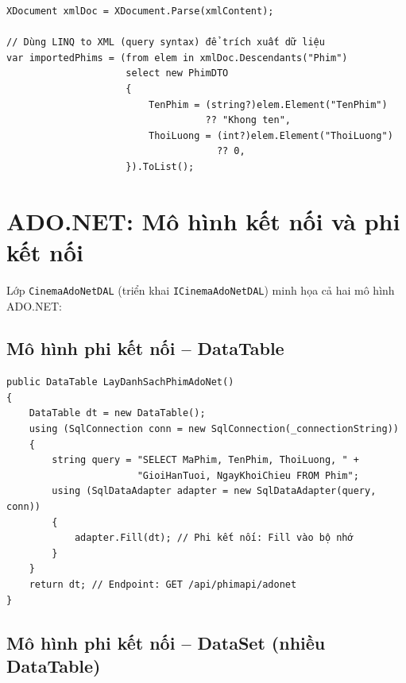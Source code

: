 \documentclass[12pt,a4paper,oneside]{book}
\theoremstyle{plain}
\numberwithin{equation}{chapter}
\begin{document}
\begin{lstlisting}[style=csharpstyle, caption={LINQ to XML -- Import phim từ XML}]
XDocument xmlDoc = XDocument.Parse(xmlContent);

// Dùng LINQ to XML (query syntax) để trích xuất dữ liệu
var importedPhims = (from elem in xmlDoc.Descendants("Phim")
                     select new PhimDTO
                     {
                         TenPhim = (string?)elem.Element("TenPhim")
                                   ?? "Khong ten",
                         ThoiLuong = (int?)elem.Element("ThoiLuong") 
                                     ?? 0,
                     }).ToList();
\end{lstlisting}

\section{ADO.NET: Mô hình kết nối và phi kết nối}\label{Sec4.3}

\noindent Lớp \texttt{CinemaAdoNetDAL} (triển khai \texttt{ICinemaAdoNetDAL}) minh họa cả hai mô hình ADO.NET:

\subsection{Mô hình phi kết nối -- DataTable}\label{sub4.3.1}

\begin{lstlisting}[style=csharpstyle, caption={ADO.NET -- SqlDataAdapter + DataTable (phi kết nối)}]
public DataTable LayDanhSachPhimAdoNet()
{
    DataTable dt = new DataTable();
    using (SqlConnection conn = new SqlConnection(_connectionString))
    {
        string query = "SELECT MaPhim, TenPhim, ThoiLuong, " +
                       "GioiHanTuoi, NgayKhoiChieu FROM Phim";
        using (SqlDataAdapter adapter = new SqlDataAdapter(query, conn))
        {
            adapter.Fill(dt); // Phi kết nối: Fill vào bộ nhớ
        }
    }
    return dt; // Endpoint: GET /api/phimapi/adonet
}
\end{lstlisting}

\subsection{Mô hình phi kết nối -- DataSet (nhiều DataTable)}\label{sub4.3.2}
\end{document}
